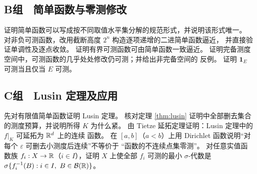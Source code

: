 \subsection*{B组　简单函数与零测修改}
\begin{enumerate}[label=\textbf{\thechapter.\arabic*.},resume]
 证明简单函数可以写成按不同取值水平集分解的规范形式，并说明该形式唯一。
 对非负可测函数，改用截断高度 $2^n$ 构造逐项递增的二进简单函数逼近，
 并直接验证单调性及逐点收敛。
 证明有界可测函数可由简单函数一致逼近。
 证明完备测度空间中，可测函数的几乎处处修改仍可测；并给出非完备空间的
 反例。
 证明 $\mathbf1_E$ 可测当且仅当 $E$ 可测。
\end{enumerate}

\subsection*{C组　Lusin 定理及应用}
\begin{enumerate}[label=\textbf{\thechapter.\arabic*.},resume]
 先对有限值简单函数证明 Lusin 定理。
 核对定理 \ref{thm:lusin} 证明中全部删去集合的测度预算，并说明所得 $K$
 为什么紧。
 由 Tietze 延拓定理证明：Lusin 定理中的 $f|_K$ 可延拓为 $\mathbb{R}^d$ 上的连续
 函数。
 在 $[a,b]$（$a<b$）上用 Dirichlet 函数说明“对每个 $\varepsilon$ 可删去小测度后连续”不等价于
 “函数的不连续点集零测”。
 对任意实值函数族 $f_i:X\to\mathbb{R}$（$i\in I$），证明 $X$ 上使全部
 $f_i$ 可测的最小 $\sigma$-代数是
 $\sigma\{f_i^{-1}(B):i\in I,\ B\in\mathcal B(\mathbb{R})\}$。
\end{enumerate}
